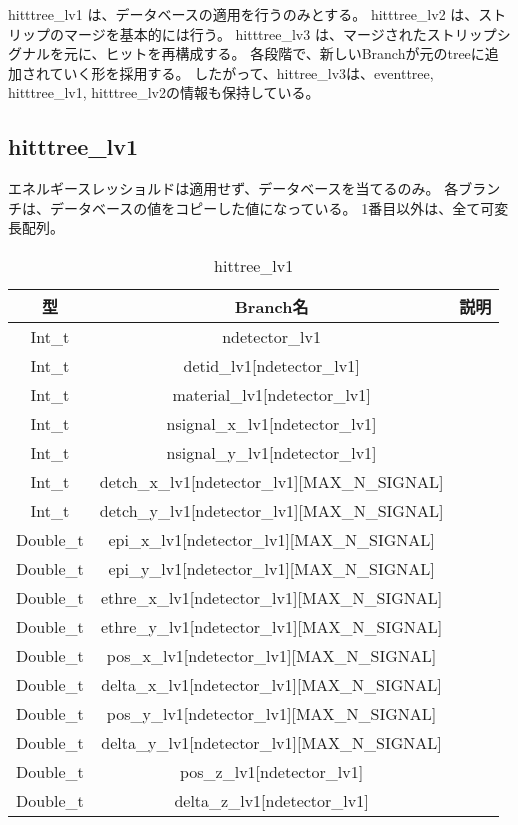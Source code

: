 \documentclass[10.5pt]{jsarticle}
\begin{document}
hitttree\_lv1 は、データベースの適用を行うのみとする。
hitttree\_lv2 は、ストリップのマージを基本的には行う。
hitttree\_lv3 は、マージされたストリップシグナルを元に、ヒットを再構成する。
各段階で、新しいBranchが元のtreeに追加されていく形を採用する。
したがって、hittree\_lv3は、eventtree, hitttree\_lv1, hitttree\_lv2の情報も保持している。

\subsection{hitttree\_lv1}
エネルギースレッショルドは適用せず、データベースを当てるのみ。
各ブランチは、データベースの値をコピーした値になっている。
1番目以外は、全て可変長配列。
\begin{table}[htb]
\begin{center}
  \begin{tabular}{|c|c|c|} \hline
  型 & Branch名  & 説明 \\ \hline
        Int\_t & ndetector\_lv1& \\
        Int\_t & detid\_lv1[ndetector\_lv1]& \\
        Int\_t & material\_lv1[ndetector\_lv1]& \\
        Int\_t & nsignal\_x\_lv1[ndetector\_lv1]& \\
        Int\_t & nsignal\_y\_lv1[ndetector\_lv1]& \\
        Int\_t & detch\_x\_lv1[ndetector\_lv1][MAX\_N\_SIGNAL]& \\
        Int\_t & detch\_y\_lv1[ndetector\_lv1][MAX\_N\_SIGNAL]& \\
        Double\_t & epi\_x\_lv1[ndetector\_lv1][MAX\_N\_SIGNAL]& \\
        Double\_t & epi\_y\_lv1[ndetector\_lv1][MAX\_N\_SIGNAL]& \\
        Double\_t & ethre\_x\_lv1[ndetector\_lv1][MAX\_N\_SIGNAL]& \\
        Double\_t & ethre\_y\_lv1[ndetector\_lv1][MAX\_N\_SIGNAL]& \\
        Double\_t & pos\_x\_lv1[ndetector\_lv1][MAX\_N\_SIGNAL]& \\
        Double\_t & delta\_x\_lv1[ndetector\_lv1][MAX\_N\_SIGNAL]& \\
        Double\_t & pos\_y\_lv1[ndetector\_lv1][MAX\_N\_SIGNAL]& \\
        Double\_t & delta\_y\_lv1[ndetector\_lv1][MAX\_N\_SIGNAL]& \\
        Double\_t & pos\_z\_lv1[ndetector\_lv1]& \\
        Double\_t & delta\_z\_lv1[ndetector\_lv1]& \\ 
   \hline
  \end{tabular}
    \caption{hittree\_lv1}
    \end{center}
\end{table}
\end{document}
